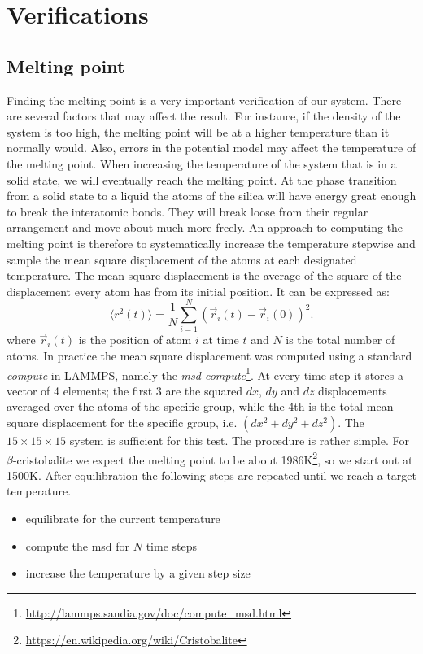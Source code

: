 \documentclass[twoside,english]{uiofysmaster}
\newcommand\lr[1]{\left(#1\right)}
\begin{document}
\section{Verifications}
\subsection{Melting point}
Finding the melting point is a very important verification of our system. 
There are several factors that may affect the result. For instance, if the density of the system is too high, the melting point will be at a higher temperature than it normally would. 
Also, errors in the potential model may affect the temperature of the melting point. 
When increasing the temperature of the system that is in a solid state, we will eventually reach the melting point.
At the phase transition from a solid state to a liquid the atoms of the silica will have energy great enough to break the interatomic bonds. 
They will break loose from their regular arrangement and move about much more freely. 
An approach to computing the melting point is therefore to systematically increase the temperature stepwise and sample the mean square displacement of the atoms at each designated temperature.  
The mean square displacement is the average of the square of the displacement every atom has from its initial position. It can be expressed as:
\begin{equation}
\langle r^2(t)\rangle = \frac{1}{N}\sum_{i=1}^{N}\lr{\vec{r}_i(t)-\vec{r}_i(0)}^2. \label{eq: diffusion constant}
\end{equation}
where $\vec{r}_i(t)$ is the position of atom $i$ at time $t$ and $N$ is the total number of atoms. 
In practice the mean square displacement was computed using a standard \textit{compute} in LAMMPS, namely the \textit{msd compute}\footnote{\url{http://lammps.sandia.gov/doc/compute_msd.html}}. 
At every time step it stores a vector of 4 elements; the first 3 are the squared $dx$, $dy$ and $dz$ displacements averaged over the atoms of the specific group, while the 4th is the total mean square displacement for the specific group, i.e. $(dx^2 + dy^2 + dz^2)$. 
The $15\times15\times15$ system is sufficient for this test. The procedure is rather simple. For $\beta$-cristobalite we expect the melting point to be about 1986K\footnote{\url{https://en.wikipedia.org/wiki/Cristobalite}}, so we start out at 1500K. After equilibration the following steps are repeated until we reach a target temperature. 
\begin{itemize}
	\item equilibrate for the current temperature
	\item compute the msd for $N$ time steps
	\item increase the temperature by a given step size
\end{itemize}

\end{document}

